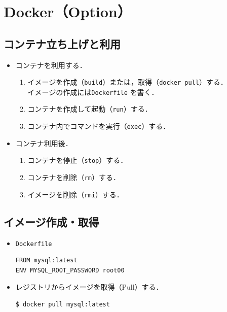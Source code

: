 \section{Docker（Option）}\label{chap:docker}
\tocc
\subsection{コンテナ立ち上げと利用}
\begin{frame}[t]{\ftitle}
    \begin{itemize}
        \setlength{\itemsep}{1em}
        \item コンテナを利用する．
              \begin{enumerate}
                  \setlength{\itemsep}{.5em}
                  \item イメージを作成（\texttt{build}）または，取得（\texttt{docker pull}）する．\\
                        イメージの作成には\texttt{Dockerfile} を書く．
                  \item コンテナを作成して起動（\texttt{run}）する．
                  \item コンテナ内でコマンドを実行（\texttt{exec}）する．
              \end{enumerate}
        \item コンテナ利用後．
              \begin{enumerate}
                  \setlength{\itemsep}{.5em}
                  \item コンテナを停止（\texttt{stop}）する．
                  \item コンテナを削除（\texttt{rm}）する．
                  \item イメージを削除（\texttt{rmi}）する．
              \end{enumerate}
    \end{itemize}
\end{frame}
\subsection{イメージ作成・取得}
\begin{frame}[containsverbatim,t]{\ftitle}
    \begin{itemize}
        \item \texttt{Dockerfile}
              \begin{lstlisting}[language=docker-compose-2]
FROM mysql:latest
ENV MYSQL_ROOT_PASSWORD root00
            \end{lstlisting}
        \item レジストリからイメージを取得（Pull）する．
              \begin{lstlisting}[backgroundcolor={\color{black}},basicstyle={\color{white}\ttfamily},]
$ docker pull mysql:latest
            \end{lstlisting}
    \end{itemize}
\end{frame}
